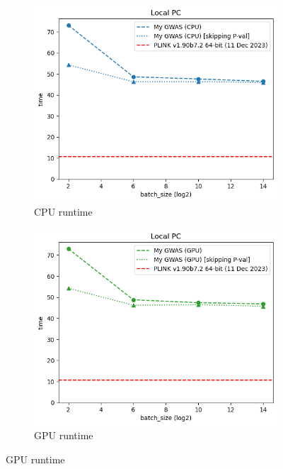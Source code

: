 \documentclass{article}
\begin{document}
\begin{figure}[h]
      \centering
      \begin{subfigure}[b]{0.32\textwidth}
            \includegraphics[width=\textwidth]{../local_CPU.png}
            \caption{CPU runtime}
            \label{fig:local_cpu}
      \end{subfigure}
      \begin{subfigure}[b]{0.32\textwidth}
            \includegraphics[width=\textwidth]{../local_GPU.png}
            \caption{GPU runtime}
            \label{fig:local_gpu}
      \end{subfigure}

\end{figure}
\end{document}
